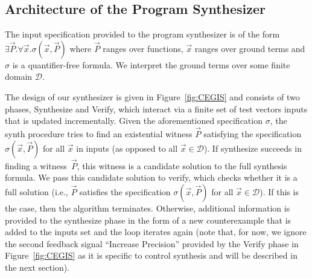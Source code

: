 \documentclass[final]{sig-alternate-05-2015}
\newcommand{\red}[1]{{\color{red}#1}}
\begin{document}


\subsection{Architecture of the Program Synthesizer}
\label{synthesizer-general}
%
% 
The input specification provided to the program synthesizer is of the form
$\exists \vec{P} .  \forall \vec{x}.  \sigma(\vec{x}, \vec{P})$ where
$\vec{P}$ ranges over functions, $\vec{x}$ ranges over ground terms and
$\sigma$ is a quantifier-free formula.  We interpret the ground terms over
some finite domain $\mathcal{D}$.

The design of our synthesizer is given in Figure~\ref{fig:CEGIS} and consists
of two phases, {\sc Synthesize} and {\sc Verify}, which interact via a
finite set of test vectors {\sc inputs} that is updated incrementally. 
Given the aforementioned specification $\sigma$, the {\sc synth} procedure
tries to find an existential witness $\vec{P}$ satisfying the specification
$\sigma(\vec{x}, \vec{P})$ for all $\vec{x}$ in {\sc inputs} (as opposed to
all $\vec{x} \in \mathcal{D}$).
%
If {\sc synthesize} succeeds in finding a witness~$\vec{P}$, this witness
is a candidate solution to the full synthesis formula.  We pass this
candidate solution to {\sc verify}, which checks whether it is a full
solution (i.e., $\vec{P}$ satisfies the specification $\sigma(\vec{x},
\vec{P})$ for all $\vec{x}\in\mathcal{D}$).
%
%
%
If this is the case, then the algorithm terminates.  Otherwise, additional
information is provided to the {\sc synthesize} phase in the form of a new
counterexample that is added to the {\sc inputs} set and the loop iterates
again (note that, for now, we ignore the second feedback signal ``Increase
Precision'' provided by the {\sc Verify} phase in Figure~\ref{fig:CEGIS} as it
is specific to control synthesis and will be described in the next section).
\end{document}
